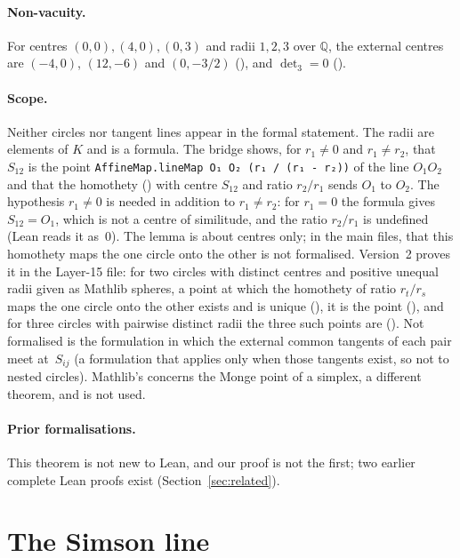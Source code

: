 \documentclass[11pt]{article}
\theoremstyle{definition}
\theoremstyle{remark}
\newcommand{\lean}[1]{\texttt{#1}}
\newcommand{\QQ}{\mathbb{Q}}
\begin{document}
\paragraph{Non-vacuity.} For centres $(0,0),(4,0),(0,3)$ and radii $1,2,3$ over $\QQ$, the
external centres are $(-4,0)$, $(12,-6)$ and $(0,-3/2)$ (), and
$\det_3=0$ ().

\paragraph{Scope.} Neither circles nor tangent lines appear in the formal statement. The radii are
elements of $K$ and  is a formula. The bridge 
shows, for $r_1\ne0$ and $r_1\ne r_2$, that $S_{12}$ is the point
\lean{AffineMap.lineMap O₁ O₂ (r₁ / (r₁ - r₂))} of the line $O_1O_2$ and that the homothety
() with centre $S_{12}$ and ratio $r_2/r_1$ sends $O_1$ to $O_2$. The
hypothesis $r_1\ne0$ is needed in addition to $r_1\ne r_2$: for $r_1=0$ the formula gives
$S_{12}=O_1$, which is not a centre of similitude, and the ratio $r_2/r_1$ is undefined (Lean reads
it as~$0$). The lemma is about centres only; in the main files, that this homothety maps the one circle onto the other
is not formalised. Version~2 proves it in the Layer-15 file: for two circles with distinct centres and positive
unequal radii given as Mathlib spheres, a point at which the homothety of ratio $r_t/r_s$ maps the
one circle onto the other exists and is unique (), it is
the point  (), and for three circles with
pairwise distinct radii the three such points are 
(). Not formalised is the formulation in which the external common
tangents of each pair meet at~$S_{ij}$ (a formulation that applies only when those tangents
exist, so not to nested circles). Mathlib's 
concerns the Monge point of a simplex, a different theorem, and is not used.

\paragraph{Prior formalisations.} This theorem is not new to Lean, and our proof is not the first;
two earlier complete Lean proofs exist (Section~\ref{sec:related}).

\section{The Simson line}\label{sec:simson}
\end{document}
